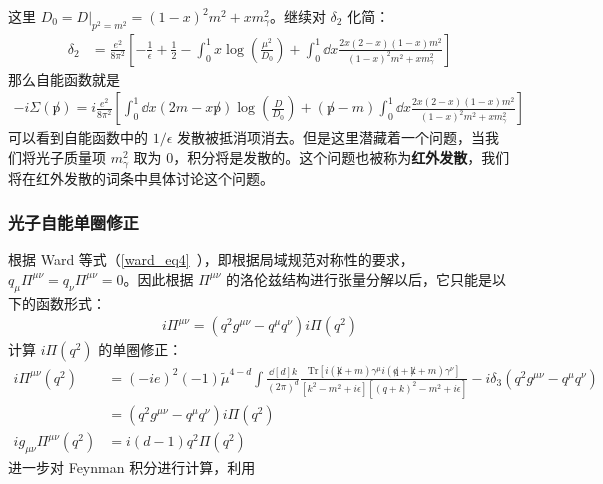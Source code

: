 这里 $D_0 = D|_{p^2=m^2}=(1-x)^2 m^2+x m_\gamma^2 $。继续对 $\delta_2$ 化简：
\begin{equation}
\begin{aligned}
\delta_2 &= \frac{e^2}{8\pi^2}\left[-\frac{1}{\epsilon}+\frac{1}{2}-\int_0^1 x\log\left(\frac{\mu^2}{D_0} \right) 
+\int_0^1\dd{x} \frac{2x(2-x)(1-x)m^2}{(1-x)^2m^2+xm_\gamma^2}
\right]
\end{aligned}
\end{equation}
那么自能函数就是
\begin{equation}
\begin{aligned}
-i\Sigma(\not p)=i\frac{e^2}{8\pi^2}\left[\int_0^1\dd x(2m-x\not p)\log\left(\frac{D}{D_0}\right)+(\not p-m)\int_0^1\dd{x}\frac{2x(2-x)(1-x)m^2}{(1-x)^2m^2+xm_\gamma^2} \right]
\end{aligned}
\end{equation}
可以看到自能函数中的 $1/\epsilon$ 发散被抵消项消去。但是这里潜藏着一个问题，当我们将光子质量项 $m_\gamma^2$ 取为 $0$，积分将是发散的。这个问题也被称为\textbf{红外发散}，我们将在红外发散的词条中具体讨论这个问题。
\subsubsection{光子自能单圈修正}
根据 Ward 等式（\autoref{ward_eq4}~），即根据局域规范对称性的要求，$q_\mu\Pi^{\mu\nu}=q_\nu \Pi^{\mu\nu}=0$。因此根据 $\Pi^{\mu\nu}$ 的洛伦兹结构进行张量分解以后，它只能是以下的函数形式：
\begin{equation}
\begin{aligned}
i\Pi^{\mu\nu}=(q^2g^{\mu\nu}-q^\mu q^\nu)i\Pi(q^2)
\end{aligned}
\end{equation}
计算 $i\Pi(q^2)$ 的单圈修正：
\begin{equation}
\begin{aligned}
i\Pi^{\mu\nu}(q^2)&=(-ie)^2 (-1) \tilde{\mu}^{4-d}\int\frac{\dd[d]{k}}{(2\pi)^d} \frac{\text{Tr}[i(\not k+m)\gamma^\mu i(\not q+\not k+m)\gamma^\nu]}{[k^2-m^2+i\epsilon][(q+k)^2-m^2+i\epsilon]}-i\delta_3 (q^2 g^{\mu\nu}-q^\mu q^\nu)\\
&=(q^2g^{\mu\nu}-q^\mu q^\nu)i\Pi(q^2)\\
i g_{\mu\nu}\Pi^{\mu\nu}(q^2) &= i (d-1) q^2 \Pi(q^2)
\end{aligned}
\end{equation}
进一步对 Feynman 积分进行计算，利用


